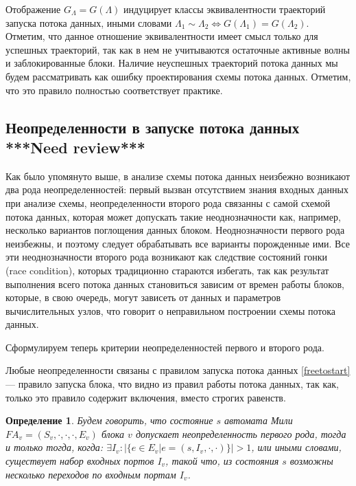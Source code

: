 \documentclass[10pt,a4paper]{article}
\newtheorem{defen}{Определение}
\newcommand{\FA}{F\!A}
\begin{document}
  Отображение $G_{\Lambda} = G(\Lambda)$ индуцирует классы эквивалентности траекторий запуска потока данных,
  иными словами $\Lambda_1 \sim \Lambda_2 \Leftrightarrow G(\Lambda_1) = G(\Lambda_2)$.
  Отметим, что данное отношение эквивалентности имеет смысл только для успешных траекторий, так как в нем не учитываются остаточные активные волны и заблокированные блоки.
  Наличие неуспешных траекторий потока данных мы будем рассматривать как ошибку проектирования схемы потока данных. Отметим, что это правило полностью соответствует практике.
  
\subsection{Неопределенности в запуске потока данных \textbf{***Need review***}}
  Как было упомянуто выше, в анализе схемы потока данных неизбежно возникают два рода неопределенностей: первый вызван отсутствием знания входных данных при анализе схемы,
  неопределенности второго рода связанны с самой схемой потока данных, которая может допускать такие неоднозначности как, например, несколько вариантов поглощения данных блоком.
  Неоднозначности первого рода неизбежны, и поэтому следует обрабатывать все варианты порожденные ими.
  Все эти неоднозначности второго рода возникают как следствие состояний гонки (race condition), которых традиционно стараются избегать,
  так как результат выполнения всего потока данных становиться зависим от времен работы блоков, которые, в свою очередь, могут зависеть от данных и
  параметров вычислительных узлов, что говорит о неправильном построении схемы потока данных.
  
  Сформулируем теперь критерии неопределенностей первого и второго рода.
  
  Любые неопределенности связаны с правилом запуска потока данных \eqref{freetostart} --- правило запуска блока, что видно из правил работы потока данных, так как,
  только это правило содержит включения, вместо строгих равенств.
  \begin{defen}
    Будем говорить, что состояние $s$ автомата Мили $\FA_v = (S_v, \cdot, \cdot, \cdot, E_v)$ блока $v$ допускает неопределенность первого рода, тогда и только тогда, когда:
    $\exists I_v: \lvert \{e \in E_v \vert e = (s, I_v, \cdot, \cdot) \} \rvert > 1$, или иными словами, существует набор входных портов $I_v$, такой что, из состояния $s$ возможны
    несколько переходов по входным портам $I_v$.
  \end{defen}
  
\end{document}

